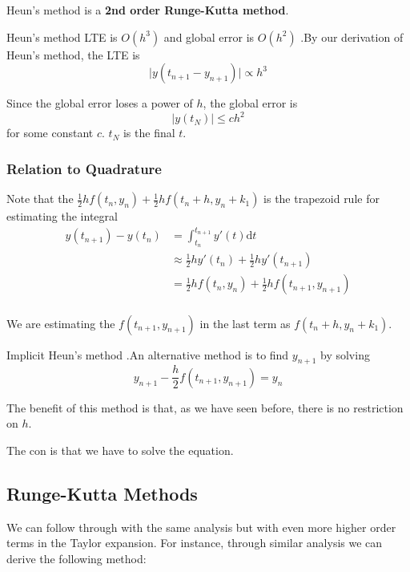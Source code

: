 \documentclass[12pt,letterpaper]{article}
\newcommand{\dd}{\mathrm{d}}
\begin{document}
Heun's method is a \textbf{2nd order Runge-Kutta method}.

\begin{theo}{Heun's method LTE is $O(h^3)$ and global error is $O(h^2)$}
.By our derivation of Heun's method, the LTE is
\begin{equation}
	\lvert y(t_{n+1} - y_{n+1}) \rvert \propto h^3
\end{equation}

Since the global error loses a power of $h$, the global error is
\begin{equation}
	\lvert y(t_N) \rvert \leq c h^2
\end{equation}
for some constant $c$. $t_N$ is the final $t$.
\end{theo}

\subsubsection{Relation to Quadrature}
Note that the $\frac{1}{2}hf(t_n, y_n) + \frac{1}{2}hf(t_n+h, y_n+k_1)$ is the trapezoid rule for estimating the integral\
\begin{align}
	y(t_{n+1}) - y(t_n) &= \int_{t_n}^{t_{n+1}} y'(t) \dd t \\
	&\approx \frac{1}{2} h y'(t_n) + \frac{1}{2} h y'(t_{n+1}) \\
	&= \frac{1}{2} h f(t_n, y_n) + \frac{1}{2} h f(t_{n+1}, y_{n+1}) \\
\end{align}

We are estimating the $f(t_{n+1}, y_{n+1})$ in the last term as $f(t_n+h, y_n+k_1)$.

\begin{algo}{Implicit Heun's method}
.An alternative method is to find $y_{n+1}$ by solving
\begin{equation}
	y_{n+1} - \frac{h}{2} f(t_{n+1}, y_{n+1}) = y_n
\end{equation}

The benefit of this method is that, as we have seen before, there is no restriction on $h$.

The con is that we have to solve the equation.
\end{algo}

\subsection{Runge-Kutta Methods}	

We can follow through with the same analysis but with even more higher order terms in the Taylor expansion. For instance, through similar analysis we can derive the following method:
\end{document}
